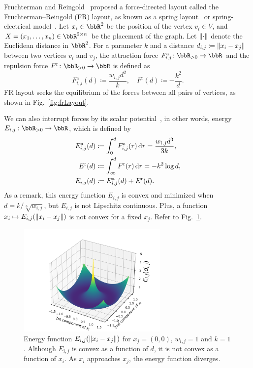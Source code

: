 \documentclass[dvipdfmx,10pt,journal,compsoc]{IEEEtran}
\newcommand{\defeq}{\coloneqq}
\begin{document}
Fruchterman and Reingold~\cite{fruchtermanGraphDrawingForcedirected1991} proposed a force-directed layout called the Fruchterman--Reingold (FR) layout, as known as a spring layout~\cite{hagberg2008exploring} or spring-electrical model~\cite{Hu2006EfficientHF}.
Let $x_i \in \bbR^2$ be the position of the vertex $v_i \in V$, and $X = (x_1, \dots, x_n) \in \bbR^{2 \times n}$ be the placement of the graph.
Let $\norm{\cdot}$ denote the Euclidean distance in $\bbR^2$. For a parameter $k$ and a distance $d_{i,j} \defeq \norm{x_i - x_j}$ between two vertices $v_i$ and $v_j$, the attraction force $F_{i,j}^\mathrm{a}\colon \bbR_{> 0} \to \bbR$ and the repulsion force $F^\mathrm{r}\colon \bbR_{> 0} \to \bbR$ is defined as
\begin{equation*}
    F_{i,j}^\mathrm{a}(d) \defeq \frac{w_{i,j} d^2}{k}, \quad F^\mathrm{r}(d) \defeq -\frac{k^2}{d}.
\end{equation*}
FR layout seeks the equilibrium of the forces between all pairs of vertices, as shown in Fig.~\ref{fig:frLayout}.

We can also interrupt forces by its scalar potential~\cite{6183577}, in other words, energy $E_{i,j}: \bbR_{> 0} \to \bbR$, which is defined by
\begin{align}
    E_{i,j}^\mathrm{a}(d) & \defeq \int_{0}^{d} F_{i,j}^\mathrm{a}(r) \dd{r} = \frac{w_{i,j} d^3}{3k},\notag \\
    E^\mathrm{r}(d)       & \defeq \int_{\infty}^{d} F^\mathrm{r}(r) \dd{r} = -k^2\log{d}, \notag            \\
    E_{i,j}(d)            & \defeq E_{i,j}^\mathrm{a}(d) + E^\mathrm{r}(d). \label{eq:Eijr}
\end{align}
As a remark, this energy function $E_{i,j}$ is convex and minimized when $d = k/\sqrt[3]{w_{i,j}}$, but $E_{i,j}$ is not Lipschitz continuous.
Plus, a function $x_i \mapsto E_{i,j}(\norm{x_i - x_j})$ is not convex for a fixed $x_j$. Refer to Fig.~\ref{fig:energy3d}.

\begin{figure}[t]
    \centering
    \includegraphics[height=5.5cm]{energy_3d/energy_3d.png}
    \caption{Energy function $E_{i,j}(\norm{x_i - x_j})$ for $x_j=(0,0)$, $w_{i,j} = 1$ and $k = 1$. Although $E_{i,j}$ is convex as a function of $d$, it is not convex as a function of $x_i$. As $x_i$ approaches $x_j$, the energy function diverges.}
    \label{fig:energy3d}
\end{figure}
\end{document}
